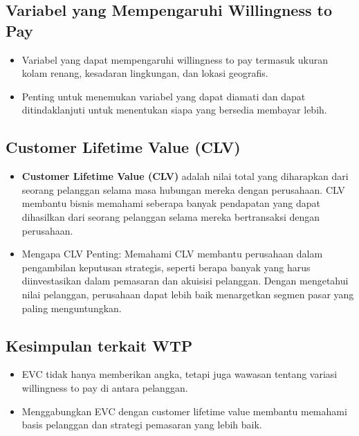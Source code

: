 \documentclass{article}
\begin{document}
\subsection{Variabel yang Mempengaruhi Willingness to Pay}
\begin{itemize}
    \item Variabel yang dapat mempengaruhi willingness to pay termasuk ukuran kolam renang, kesadaran lingkungan, dan lokasi geografis.
    \item Penting untuk menemukan variabel yang dapat diamati dan dapat ditindaklanjuti untuk menentukan siapa yang bersedia membayar lebih.
\end{itemize}

\subsection{Customer Lifetime Value (CLV)}
\begin{itemize}
    \item \textbf{Customer Lifetime Value (CLV)} adalah nilai total yang diharapkan dari seorang pelanggan selama masa hubungan mereka dengan perusahaan. CLV membantu bisnis memahami seberapa banyak pendapatan yang dapat dihasilkan dari seorang pelanggan selama mereka bertransaksi dengan perusahaan.
    \item Mengapa CLV Penting: Memahami CLV membantu perusahaan dalam pengambilan keputusan strategis, seperti berapa banyak yang harus diinvestasikan dalam pemasaran dan akuisisi pelanggan. Dengan mengetahui nilai pelanggan, perusahaan dapat lebih baik menargetkan segmen pasar yang paling menguntungkan.
\end{itemize}

\subsection{Kesimpulan terkait WTP}
\begin{itemize}
    \item EVC tidak hanya memberikan angka, tetapi juga wawasan tentang variasi willingness to pay di antara pelanggan.
    \item Menggabungkan EVC dengan customer lifetime value membantu memahami basis pelanggan dan strategi pemasaran yang lebih baik.
\end{itemize}



\end{document}
